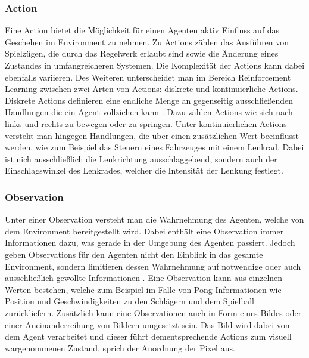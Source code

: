 \documentclass[11pt]{scrartcl}
\begin{document}
\subsubsection{Action}
\label{sec:action}
Eine Action bietet die Möglichkeit für einen Agenten aktiv Einfluss auf das Geschehen im
Environment zu nehmen. Zu Actions zählen das Ausführen von Spielzügen, die durch das
Regelwerk erlaubt sind sowie die Änderung eines Zustandes in umfangreicheren Systemen. Die
Komplexität der Actions kann dabei ebenfalls variieren. Des Weiteren unterscheidet man im Bereich
Reinforcement Learning zwischen zwei Arten von Actions: diskrete und kontinuierliche Actions.
Diskrete Actions definieren eine endliche Menge an gegenseitig ausschließenden Handlungen die ein
Agent vollziehen kann \cite[~S.8]{L2018}. Dazu zählen Actions wie sich nach links und rechts zu
bewegen oder zu springen. Unter kontinuierlichen Actions versteht man hingegen Handlungen, die
über einen zusätzlichen Wert beeinflusst werden, wie zum Beispiel das Steuern eines Fahrzeuges
mit einem Lenkrad. Dabei ist nich ausschließlich die Lenkrichtung ausschlaggebend, sondern auch
der Einschlagswinkel des Lenkrades, welcher die Intensität der Lenkung festlegt.


\subsubsection{Observation}
Unter einer Observation versteht man die Wahrnehmung des Agenten, welche von dem Environment 
bereitgestellt wird. Dabei enthält eine Observation immer Informationen dazu, was gerade in der
Umgebung des Agenten passiert. Jedoch geben Observations für den Agenten nicht den Einblick
in das gesamte Environment, sondern limitieren dessen Wahrnehmung auf notwendige oder auch
ausschließlich gewollte Informationen \cite[~S.8 f.]{L2018}. Eine Observation kann aus einzelnen
Werten bestehen, welche zum Beispiel im Falle von Pong Informationen wie Position und
Geschwindigkeiten zu den Schlägern und dem Spielball zurückliefern. Zusätzlich kann eine
Observationen auch in Form eines Bildes oder einer Aneinanderreihung von Bildern umgesetzt sein.
Das Bild wird dabei von dem Agent verarbeitet und dieser führt dementsprechende Actions zum
visuell wargenommenen Zustand, sprich der Anordnung der Pixel aus. 
\end{document}
